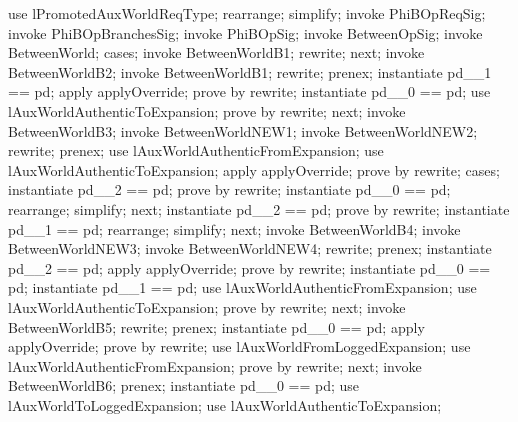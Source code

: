 \begin{LPScript}\begin{zproof}[lPromotedBetweenWorldReqType]
\end{zproof}%
    use lPromotedAuxWorldReqType;
    rearrange;
    simplify;
    invoke PhiBOpReqSig;
    invoke PhiBOpBranchesSig;
    invoke PhiBOpSig;
    invoke BetweenOpSig;
    invoke BetweenWorld;
    cases;
        invoke BetweenWorldB1;
        rewrite;
    next;
        invoke BetweenWorldB2;
        invoke BetweenWorldB1;
        rewrite;
        prenex;
        instantiate pd\_\_1 == pd;
        apply applyOverride;
        prove by rewrite;
        instantiate pd\_\_0 == pd;
        use lAuxWorldAuthenticToExpansion;
        prove by rewrite;
    next;
        invoke BetweenWorldB3;
        invoke BetweenWorldNEW1;
        invoke BetweenWorldNEW2;
        rewrite;
        prenex;
        use lAuxWorldAuthenticFromExpansion;
        use lAuxWorldAuthenticToExpansion;
        apply applyOverride;
        prove by rewrite;
        cases;
            instantiate pd\_\_2 == pd;
            prove by rewrite;
            instantiate pd\_\_0 == pd;
            rearrange;
			simplify;
        next;
            instantiate pd\_\_2 == pd;
            prove by rewrite;
            instantiate pd\_\_1 == pd;
            rearrange;
            simplify;
    next;
        invoke BetweenWorldB4;
        invoke BetweenWorldNEW3;
        invoke BetweenWorldNEW4;
        rewrite;
        prenex;
        instantiate pd\_\_2 == pd;
        apply applyOverride;
        prove by rewrite;
        instantiate pd\_\_0 == pd;
        instantiate pd\_\_1 == pd;
        use lAuxWorldAuthenticFromExpansion;
        use lAuxWorldAuthenticToExpansion;
        prove by rewrite;
    next;
        invoke BetweenWorldB5;
        rewrite;
        prenex;
        instantiate pd\_\_0 == pd;
        apply applyOverride;
        prove by rewrite;
        use lAuxWorldFromLoggedExpansion;
        use lAuxWorldAuthenticFromExpansion;
        prove by rewrite;
    next;
        invoke BetweenWorldB6;
        prenex;
        instantiate pd\_\_0 == pd;
        use lAuxWorldToLoggedExpansion;
        use lAuxWorldAuthenticToExpansion;

\end{LPScript}
